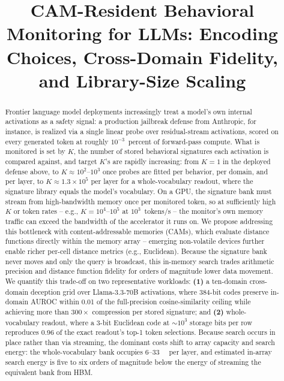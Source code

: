 \documentclass[conference]{IEEEtran}
\newcommand{\cam}{{CAM}\xspace}
\newcommand{\auroc}{{AUROC}\xspace}
\begin{document}

\title{\cam-Resident Behavioral Monitoring for LLMs: Encoding Choices,
Cross-Domain Fidelity, and Library-Size Scaling}

\author{
}

\maketitle

\begin{abstract}
Frontier language model deployments increasingly treat a model's own internal
activations as a safety signal: a production jailbreak defense from
Anthropic, for instance, is realized via a single linear probe over residual-stream
activations, scored on every generated token at roughly
$10^{-3}$~percent of forward-pass compute. What is monitored is set by
$K$, the number of stored behavioral signatures each activation is
compared against, and target $K$'s are rapidly increasing: from $K=1$
in the deployed defense above, to $K\!\approx\!10^{2}$--$10^{3}$ once
probes are fitted per behavior, per domain, and per layer, to
$K\!\approx\!1.3\!\times\!10^{5}$ per layer for a whole-vocabulary
readout, where the signature library equals the model's vocabulary. On a GPU,
the signature bank must stream from high-bandwidth memory once per
monitored token, so at sufficiently high $K$ or token rates -- e.g.,
$K=10^{4}$--$10^{5}$ at $10^{3}$~tokens/s -- the monitor's own memory
traffic can exceed the bandwidth of the accelerator it runs
on. We
propose addressing this bottleneck with content-addressable memories
(\cam{}s), which evaluate distance functions directly within the
memory array -- emerging non-volatile devices further enable
richer per-cell distance metrics (e.g., Euclidean). Because the signature bank never moves and only the query is
broadcast, this in-memory search trades arithmetic precision and distance function fidelity for orders of magnitude lower data movement. We quantify this trade-off on two
representative workloads: {\bf (1)} a ten-domain cross-domain
deception grid over Llama-3.3-70B activations, where 384-bit codes
preserve in-domain \auroc within 0.01 of the full-precision cosine-similarity
ceiling while achieving more than $300\times$ compression per stored signature; and
{\bf (2)} whole-vocabulary readout, where a 3-bit Euclidean code at
$\sim$$10^{3}$ storage bits per row reproduces 0.96 of the exact
readout's top-1 token selections. Because search occurs in place
rather than via streaming, the dominant costs shift to array capacity and search energy: the
whole-vocabulary bank occupies 6--\qty{33}{\mega\byte} per layer, and estimated
in-array search energy is five to six orders of
magnitude below the energy of streaming the equivalent bank from
HBM.
\end{abstract}
\end{document}
